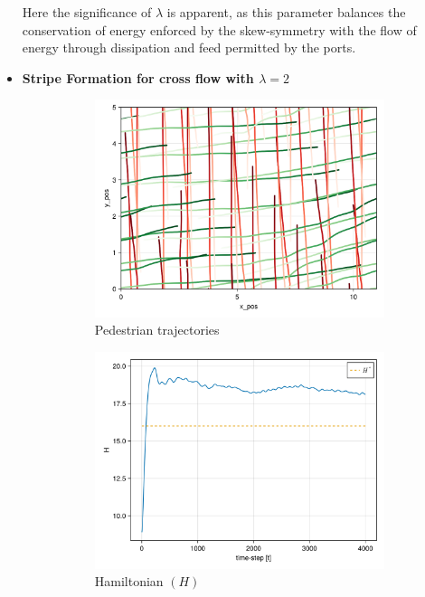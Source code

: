 \begin{itemize}
Here the significance of $\lambda$ is apparent, as this parameter balances the conservation of energy enforced by the skew-symmetry with the flow of energy through dissipation and feed permitted by the ports.
\pagebreak
    \item \textbf{Stripe Formation for cross flow with $\lambda = 2$}
    \begin{figure}[H]
        \centering
        \begin{subfigure}{\textwidth}
            \centering
            \includegraphics[width=0.6\linewidth]{figures/crossleapflow_10000.png}
            \caption{Pedestrian trajectories}
            \label{plot:cross2_traj}
        \end{subfigure}
        \begin{subfigure}{.40\textwidth}
            \centering
            \includegraphics[width=\linewidth]{figures/H_cross2.png}
            \caption{Hamiltonian $(H)$}
            \label{plot:cross2_h}
        \end{subfigure}
        \begin{subfigure}{.40\textwidth}

\end{subfigure}
\end{figure}
\end{itemize}
